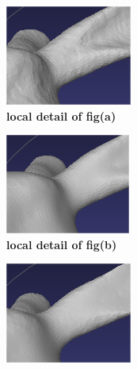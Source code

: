 \documentclass{ctexart}
\begin{document}
\begin{figure}[htbp]
\begin{subfigure}[htbp]{0.24\linewidth}
        \includegraphics[width=0.9\linewidth]{figures/detail_1.png}
        \caption{\textbf{local detail of fig(a)}}
    \end{subfigure}
    \begin{subfigure}[htbp]{0.24\linewidth}
        \centering
        \includegraphics[width=0.9\linewidth]{figures/detail_5.png}
        \caption{\textbf{local detail of fig(b)}}
    \end{subfigure}
    \begin{subfigure}[htbp]{0.24\linewidth}
        \centering
        \includegraphics[width=0.9\linewidth]{figures/detail_9.png}

\end{subfigure}
\end{figure}
\end{document}

